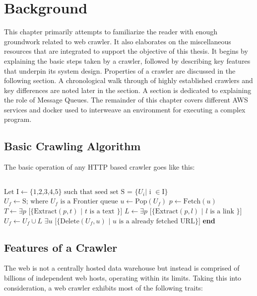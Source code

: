 \chapter{Background}
This chapter primarily attempts to familiarize the reader with enough groundwork related to web crawler. It
also elaborates on the miscellaneous resources that are integrated to support the objective of this thesis.
It begins by explaining the basic steps taken by a crawler, followed by describing key features that
underpin its system design. Properties of a crawler are discussed in the following section. A
chronological walk through of highly established crawlers and key differences are noted later in the
section. A section is dedicated to explaining the role of Message Queues. The remainder of this chapter covers
different AWS services and docker used to interweave an environment for executing a complex program.


\section{Basic Crawling Algorithm}\label{basicalgo}
The basic operation of any HTTP based crawler goes like this:
\\
\\
\begin{algorithm}
\begin{algorithmic}[1]
  \State $\text{Let I} \gets \text{\{1,2,3,4,5\}} \text{ such that seed set S = \{} U_i \text{| i } \in \text{I\}}$
  \State $U_f \gets \text{S; where } U_f \text{ is a Frontier queue}$
    \State $u \gets \text{Pop}(U_f)$ 
    \State $p \gets \text{Fetch}(u)$
    \State $T \gets \exists p\text{ [\{Extract}(p, t) \text{ | } t \text{ is a text \}]}$
    \State $L \gets \exists p\text{ [\{Extract}(p, l) \text{ | } l \text{ is a link \}]}$
    \State $U_f \gets U_f \cup L$
    \State $\exists u\text{ [\{Delete}(U_f, u) \text{ | } u \text{ is a already fetched URL\}]}$
  \EndWhile
\EndProcedure
\State \textbf{end}
\end{algorithmic}
\end{algorithm}

\pagebreak

\section{Features of a Crawler}
The web is not a centrally hosted data warehouse but instead is comprised of billions of independent
web hosts, operating within its limits. Taking this into consideration, a web crawler exhibits most of the
following traits:

